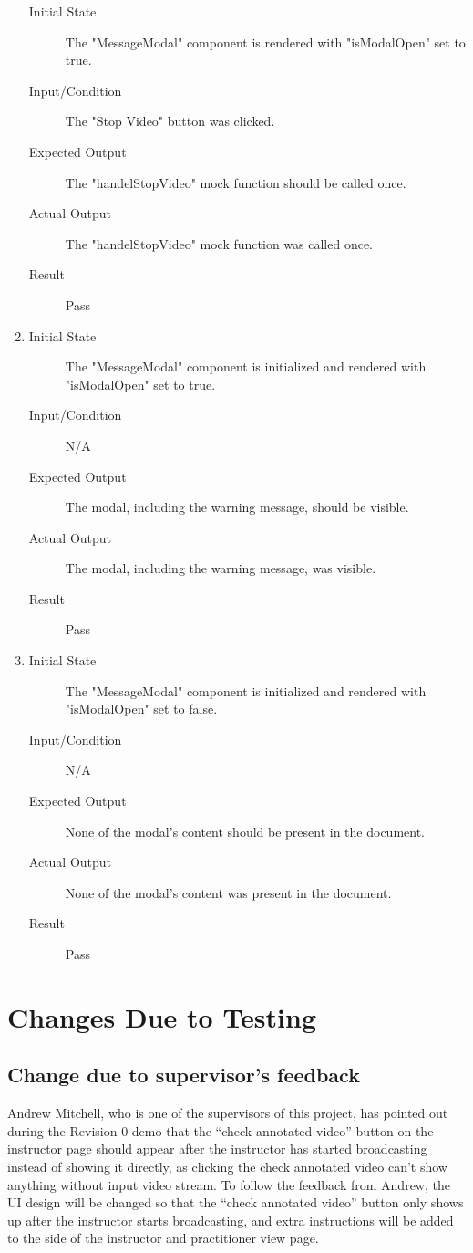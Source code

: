 \documentclass[12pt, titlepage]{article}
\begin{document}
\begin{enumerate}[UT-OT1]
\begin{description}
    \item[Initial State] The "MessageModal" component is rendered with "isModalOpen" set to true.
    \item[Input/Condition] The "Stop Video" button was clicked.
    \item[Expected Output] The "handelStopVideo" mock function should be called once.
    \item[Actual Output] The "handelStopVideo" mock function was called once.
    \item[Result] Pass
    \end{description}
  \item \label{UT-OT5}
    \begin{description}
    \item[Initial State] The "MessageModal" component is initialized and rendered with "isModalOpen" set to true.
    \item[Input/Condition] N/A
    \item[Expected Output] The modal, including the warning message, should be visible.
    \item[Actual Output] The modal, including the warning message, was visible.
    \item[Result] Pass
    \end{description}
  \item \label{UT-OT6}
    \begin{description}
    \item[Initial State] The "MessageModal" component is initialized and rendered with "isModalOpen" set to false.
    \item[Input/Condition] N/A
    \item[Expected Output] None of the modal's content should be present in the document.
    \item[Actual Output] None of the modal's content was present in the document.
    \item[Result] Pass
    \end{description}
\end{enumerate}

\section{Changes Due to Testing}

\subsection{Change due to supervisor's feedback}
Andrew Mitchell, who is one of the supervisors of this project, has pointed out during the Revision 0 demo that the “check annotated video” button on the instructor page should appear after the instructor has started broadcasting instead of showing it directly, as clicking the check annotated video can’t show anything without input video stream. To follow the feedback from Andrew, the UI design will be changed so that the “check annotated video” button only shows up after the instructor starts broadcasting, and extra instructions will be added to the side of the instructor and practitioner view page.
\end{document}
